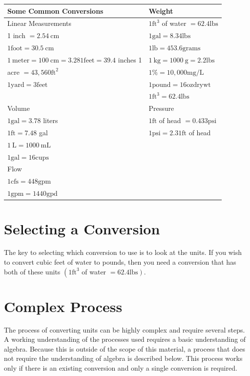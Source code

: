 \documentclass[10pt]{article}
\begin{document}
\begin{tabular}{|l|l|}
\hline
Some Common Conversions & Weight \\
\hline
Linear Measurements & $1 \mathrm{ft}^{3}$ of water $=62.4 \mathrm{lbs}$ \\
\hline
1 inch $=2.54 \mathrm{~cm}$ & $1 \mathrm{gal}=8.34 \mathrm{lbs}$ \\
$1 \mathrm{foot}=30.5 \mathrm{~cm}$ & $1 \mathrm{lb}=453.6 \mathrm{grams}$ \\
$1 \mathrm{~meter}=100 \mathrm{~cm}=3.281 \mathrm{feet}=39.4$ inches 1 & $1 \mathrm{~kg}=1000 \mathrm{~g}=2.2 \mathrm{lbs}$ \\
acre $=43,560 \mathrm{ft}^{2}$ & $1 \%=10,000 \mathrm{mg} / \mathrm{L}$ \\
$1 \mathrm{yard}=3 \mathrm{feet}$ & $1 \mathrm{pound}=16 \mathrm{oz} \mathrm{dry} \mathrm{wt}$ \\
 & $1 \mathrm{ft}^{3}=62.4 \mathrm{lbs}$ \\
\hline
Volume & Pressure \\
\hline
$1 \mathrm{gal}=3.78$ liters & $1 \mathrm{ft}$ of head $=0.433 \mathrm{psi}$ \\
$1 \mathrm{ft}=7.48$ gal & $1 \mathrm{psi}=2.31 \mathrm{ft}$ of head \\
$1 \mathrm{~L}=1000 \mathrm{~mL}$ &  \\
$1 \mathrm{gal}=16 \mathrm{cups}$ &  \\
\hline
Flow &  \\
\hline
$1 \mathrm{cfs}=448 \mathrm{gpm}$ &  \\
$1 \mathrm{gpm}=1440 \mathrm{gpd}$ &  \\
\hline
\end{tabular}

\section{Selecting a Conversion}
The key to selecting which conversion to use is to look at the units. If you wish to convert cubic feet of water to pounds, then you need a conversion that has both of these units $\left(1 \mathrm{ft}^{3}\right.$ of water $\left.=62.4 \mathrm{lbs}\right)$.

\section{Complex Process}
The process of converting units can be highly complex and require several steps. A working understanding of the processes used requires a basic understanding of algebra. Because this is outside of the scope of this material, a process that does not require the understanding of algebra is described below. This process works only if there is an existing conversion and only a single conversion is required.
\end{document}
